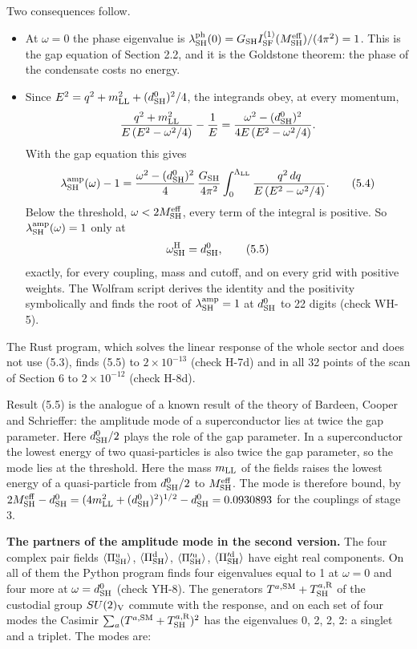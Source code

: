 \documentclass[
  10pt,
]{article}
\providecommand{\tightlist}{%
  \setlength{\itemsep}{0pt}\setlength{\parskip}{0pt}}
\begin{document}
Two consequences follow.

\begin{itemize}
\tightlist
\item
  At \(\omega=0\) the phase eigenvalue is
  \(\lambda^{\rm ph}_{\rm SH}(0)=G_{\rm SH}I^{(1)}_{\rm SF}(M^{\rm eff}_{\rm SH})/(4\pi^2)=1\).
  This is the gap equation of Section 2.2, and it is the Goldstone
  theorem: the phase of the condensate costs no energy.
\item
  Since \(E^2=q^2+m_{\rm LL}^2+(d^0_{\rm SH})^2/4\), the integrands
  obey, at every momentum,
  \[\frac{q^2+m_{\rm LL}^2}{E\,(E^2-\omega^2/4)}-\frac1E=\frac{\omega^2-(d^0_{\rm SH})^2}{4E\,(E^2-\omega^2/4)}.\]
  With the gap equation this gives
  \[\lambda^{\rm amp}_{\rm SH}(\omega)-1=\frac{\omega^2-(d^0_{\rm SH})^2}{4}\,\frac{G_{\rm SH}}{4\pi^2}\int_0^{\Lambda_{\rm LL}}\frac{q^2\,dq}{E\,(E^2-\omega^2/4)}.\tag{5.4}\]
  Below the threshold, \(\omega<2M^{\rm eff}_{\rm SH}\), every term of
  the integral is positive. So \(\lambda^{\rm amp}_{\rm SH}(\omega)=1\)
  only at \[\omega^{\rm H}_{\rm SH}=d^0_{\rm SH},\tag{5.5}\] exactly,
  for every coupling, mass and cutoff, and on every grid with positive
  weights. The Wolfram script derives the identity and the positivity
  symbolically and finds the root of \(\lambda^{\rm amp}_{\rm SH}=1\) at
  \(d^0_{\rm SH}\) to 22 digits (check WH-5).
\end{itemize}

The Rust program, which solves the linear response of the whole sector
and does not use (5.3), finds (5.5) to \(2\times10^{-13}\) (check H-7d)
and in all 32 points of the scan of Section 6 to \(2\times10^{-12}\)
(check H-8d).

Result (5.5) is the analogue of a known result of the theory of Bardeen,
Cooper and Schrieffer: the amplitude mode of a superconductor lies at
twice the gap parameter. Here \(d^0_{\rm SH}/2\) plays the role of the
gap parameter. In a superconductor the lowest energy of two
quasi-particles is also twice the gap parameter, so the mode lies at the
threshold. Here the mass \(m_{\rm LL}\) of the fields raises the lowest
energy of a quasi-particle from \(d^0_{\rm SH}/2\) to
\(M^{\rm eff}_{\rm SH}\). The mode is therefore bound, by
\(2M^{\rm eff}_{\rm SH}-d^0_{\rm SH}=(4m_{\rm LL}^2+(d^0_{\rm SH})^2)^{1/2}-d^0_{\rm SH}=0.0930893\)
for the couplings of stage 3.

\textbf{The partners of the amplitude mode in the second version.} The
four complex pair fields \(\langle\Pi^{\rm u}_{\rm SH}\rangle\),
\(\langle\Pi^{\rm d}_{\rm SH}\rangle\),
\(\langle\Pi'^{\rm u}_{\rm SH}\rangle\),
\(\langle\Pi'^{\rm d}_{\rm SH}\rangle\) have eight real components. On
all of them the Python program finds four eigenvalues equal to 1 at
\(\omega=0\) and four more at \(\omega=d^0_{\rm SH}\) (check YH-8). The
generators \(T^{a,{\rm SM}}+T^{a,{\rm R}}_{\rm SH}\) of the custodial
group \(SU(2)_{\rm V}\) commute with the response, and on each set of
four modes the Casimir
\(\sum_a(T^{a,{\rm SM}}+T^{a,{\rm R}}_{\rm SH})^2\) has the eigenvalues
0, 2, 2, 2: a singlet and a triplet. The modes are:
\end{document}
